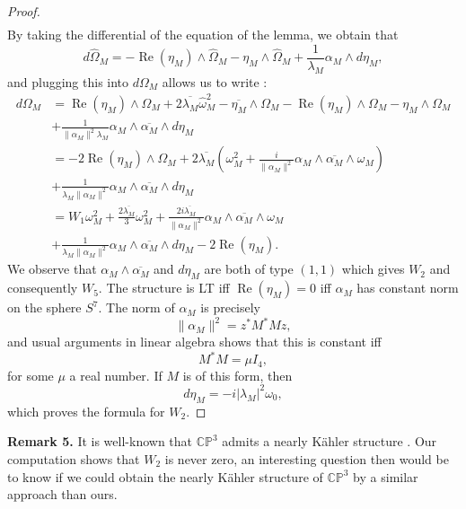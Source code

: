 \documentclass[12pt, reqno]{amsart}
\DeclareMathOperator\Ree{Re}
\newcommand{\C}{\mathbb{C}}
\newcommand{\p}{\mathbb{P}}
\begin{document}
\begin{proof}
\begin{align*}
    \end{align*}
    By taking the differential of the equation of the lemma, we obtain that \[d\hat\Omega_M=-\Ree(\eta_M)\wedge\hat\Omega_M-\eta_M\wedge\hat\Omega_M+\frac{1}{\lambda_M}\alpha_M\wedge d\eta_M,\] and plugging this into $d\Omega_M$ allows us to write :
    \begin{align*}
        d\Omega_M&=\Ree(\eta_M)\wedge\Omega_M+2\overline{\lambda_M}\hat\omega_M^2-\overline{\eta_M}\wedge\Omega_M-\Ree(\eta_M)\wedge\Omega_M-\eta_M\wedge\Omega_M\\&+\frac{1}{\|\alpha_M\|^2\lambda_M}\alpha_M\wedge\overline{\alpha_M}\wedge d\eta_M\\
        &=-2\Ree(\eta_M)\wedge\Omega_M+2\overline{\lambda_M}(\omega_M^2+\frac{i}{\|\alpha_M\|^2}\alpha_M\wedge\overline{\alpha_M}\wedge\omega_M)\\&+\frac{1}{\lambda_M\|\alpha_M\|^2}\alpha_M\wedge\overline{\alpha_M}\wedge d\eta_M\\
      &=W_1\omega_M^2+\frac{2\overline{\lambda_M}}{3}\omega_M^2+\frac{2i\overline{\lambda_M}}{\|\alpha_M\|^2}\alpha_M\wedge\overline{\alpha_M}\wedge\omega_M\\&+\frac{1}{\lambda_M\|\alpha_M\|^2}\alpha_M\wedge\overline{\alpha_M}\wedge d\eta_M-2\Ree(\eta_M).
    \end{align*}
    We observe that $\alpha_M\wedge\overline{\alpha_M}$ and $d\eta_M$ are both of type $(1,1)$ which gives $W_2$ and consequently $W_5$. The structure is LT iff $\Ree(\eta_M)=0$ iff $\alpha_M$ has constant norm on the sphere $S^7$. The norm of $\alpha_M$ is precisely \[\|\alpha_M\|^2=z^*M^*Mz,\] and usual arguments in linear algebra shows that this is constant iff \[M^*M=\mu I_4,\] for some $\mu$ a real number. If $M$ is of this form, then \[d\eta_M=-i|\lambda_M|^2\omega_0,\] which proves the formula for $W_2$.
\end{proof}
\noindent\textbf{Remark 5.} It is well-known that $\C\p^3$ admits a nearly Kähler structure \cite{butruille2006homogeneousnearlykahlermanifolds}. Our computation shows that $W_2$ is never zero, an interesting question then would be to know if we could obtain the nearly Kähler structure of $\C\p^3$ by a similar approach than ours.
\printbibliography
\end{document}

